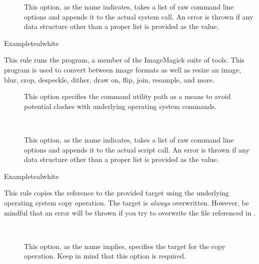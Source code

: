 \begin{description}
\begin{description}
\item[] This option, as the name indicates, takes a list of raw command line options and appends it to the actual system call. An error is thrown if any data structure other than a proper list is provided as the value.
\end{description}

\begin{codebox}{Example}{teal}{\icnote}{white}
\end{codebox}

\item[\rulebox{convert}]
This rule runs the  program, a member of the ImageMagick suite of tools. This program is used to convert between image formats as well  as  resize  an  image, blur, crop, despeckle, dither, draw on, flip, join, resample, and more.

\begin{description}
\item[] This option specifies the command utility path as a means to avoid potential clashes with underlying operating system commands.

\item[~\rqbox] This option, as the name indicates, takes a list of raw command line options and appends it to the actual script call. An error is thrown if any data structure other than a proper list is provided as the value.
\end{description}

\begin{codebox}{Example}{teal}{\icnote}{white}
\end{codebox}

\item[\rulebox{copy}]
This rule copies the  reference to the provided target using the underlying operating system copy operation. The target is \emph{always} overwritten. However, be mindful that an error will be thrown if you try to overwrite the file referenced in .

\begin{description}
\item[~\rqbox] This option, as the name implies, specifies the target for the copy operation. Keep in mind that this option is required.
\end{description}


\end{description}
